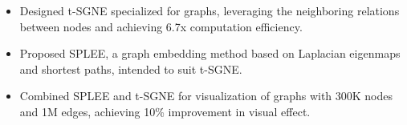 


\begin{itemize}[nosep]
  \item Designed t-SGNE specialized for graphs, leveraging the neighboring relations between nodes and achieving 6.7x computation efficiency.
  \item Proposed SPLEE, a graph embedding method based on Laplacian eigenmaps and shortest paths, intended to suit t-SGNE. 
  \item Combined SPLEE and t-SGNE for visualization of graphs with 300K nodes and 1M edges, achieving 10\% improvement in visual effect.
\end{itemize}

